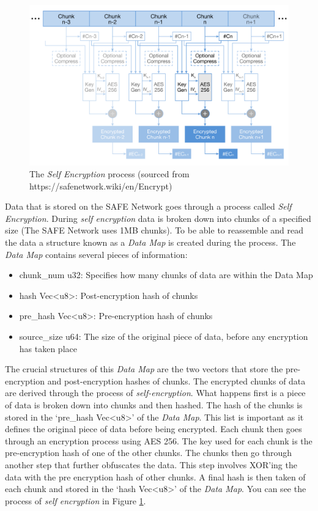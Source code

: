 \begin{figure}[h]
	\begin{center}
		\includegraphics[width=\textwidth]{diagrams/self-encryption}
		\caption{The \textit{Self Encryption} process (sourced from https://safenetwork.wiki/en/Encrypt)}
		\label{fig:self-encryption}
	\end{center}
\end{figure}

Data that is stored on the SAFE Network goes through a process called \textit{Self Encryption}\cite{irvine2010self}. During \textit{self encryption} data is broken down into chunks of a specified size (The SAFE Network uses 1MB chunks). To be able to reassemble and read the data a structure known as a \textit{Data Map} is created during the process. The \textit{Data Map} contains several pieces of information:

\begin{itemize}
	\item chunk\_num u32: Specifies how many chunks of data are within the Data Map
	\item hash Vec\textless u8\textgreater: Post-encryption hash of chunks
	\item pre\_hash Vec\textless u8\textgreater: Pre-encryption hash of chunks
	\item source\_size u64: The size of the original piece of data, before any encryption has taken place
\end{itemize}

The crucial structures of this \textit{Data Map} are the two vectors that store the pre-encryption and post-encryption hashes of chunks. The encrypted chunks of data are derived through the process of \textit{self-encryption}. What happens first is a piece of data is broken down into chunks and then hashed. The hash of the chunks is stored in the `pre\_hash Vec\textless u8\textgreater' of the \textit{Data Map}. This list is important as it defines the original piece of data before being encrypted. Each chunk then goes through an encryption process using AES 256. The key used for each chunk is the pre-encryption hash of one of the other chunks. The chunks then go through another step that further obfuscates the data. This step involves XOR'ing the data with the pre encryption hash of other chunks. A final hash is then taken of each chunk and stored in the `hash Vec\textless u8\textgreater' of the \textit{Data Map}. You can see the process of \textit{self encryption} in Figure \ref{fig:self-encryption}.

